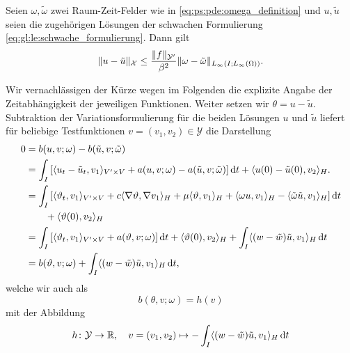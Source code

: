 \begin{Lemma}
\label{satz:voll_stabil_ey}
    Seien $\omega, \tilde{\omega}$ zwei Raum-Zeit-Felder wie in \cref{eq:ps:pde:omega_definition} und $u, \tilde{u}$ seien die zugehörigen Lösungen der schwachen Formulierung \cref{eq:gl:le:schwache_formulierung}.
    Dann gilt
    \begin{equation}
        \lVert u - \tilde{u}\rVert_{\mathcal X} \leq \frac{\lVert f\rVert_{\mathcal Y'}}{\beta^{2}} \lVert\omega - \tilde{\omega}\rVert_{L_{\infty}(I; L_{\infty}(\Omega))}.
    \end{equation}

    \begin{Beweis}
        Wir vernachlässigen der Kürze wegen im Folgenden die explizite Angabe der Zeitabhängigkeit der jeweiligen Funktionen.
        Weiter setzen wir $\theta = u - \tilde{u}$.
        Subtraktion der Variationsformulierung für die beiden Lösungen $u$ und $\tilde{u}$ liefert für beliebige Testfunktionen $v = (v_{1}, v_{2}) \in \mathcal Y$ die Darstellung
        \begin{align}
            0
            &= b(u, v; \omega) - b(\tilde{u}, v; \tilde{\omega})
           \\&= \int_{I} \left[ \langle u_{t} - \tilde{u}_{t},v_{1}\rangle_{V' \times V} + a(u, v; \omega) - a(\tilde{u}, v; \tilde{\omega}) \right] \mathop{}\!\mathrm{d} t + \langle u(0) - \tilde{u}(0),v_{2}\rangle_{H}.
           \\&= \int_{I} \left[ \langle\vartheta_{t},v_{1}\rangle_{V' \times V} + c \langle\nabla \vartheta,\nabla v_{1}\rangle_{H} + \mu \langle\vartheta,v_{1}\rangle_{H} + \langle\omega u,v_{1}\rangle_{H} - \langle\tilde{\omega}\tilde{u},v_{1}\rangle_{H} \right] \mathop{}\!\mathrm{d} t
           \\&\qquad + \langle\vartheta(0),v_{2}\rangle_{H}
           \\&= \int_{I} \left[ \langle\vartheta_{t},v_{1}\rangle_{V' \times V} + a(\vartheta, v; \omega) \right] \mathop{}\!\mathrm{d} t + \langle\vartheta(0),v_{2}\rangle_{H} + \int_{I} \langle(w - \tilde{w})\tilde{u},v_{1}\rangle_{H} \mathop{}\!\mathrm{d} t
           \\&= b(\vartheta, v; \omega) + \int_{I} \langle(w - \tilde{w})\tilde{u},v_{1}\rangle_{H} \mathop{}\!\mathrm{d} t,
        \end{align}
        welche wir auch als
        \begin{equation}
            \label{eq:alle_so_yeah}
            b(\theta, v; \omega) = h(v)
        \end{equation}
        mit der Abbildung
        \begin{equation}
            h \colon \mathcal Y \to \mathbb{R}, \quad v = (v_{1}, v_{2}) \mapsto - \int_{I} \skp{(w - \tilde{w})\tilde{u}}{v_{1}}{H} \diff t

\end{equation}
\end{Beweis}
\end{Lemma}
